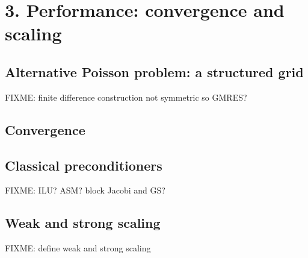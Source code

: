 
\chapter{3. Performance: convergence and scaling}

\section{Alternative Poisson problem: a structured grid}

FIXME: finite difference construction not symmetric so GMRES?


\section{Convergence}

\section{Classical preconditioners}

FIXME:  ILU?  ASM?  block Jacobi and GS?

\section{Weak and strong scaling}

FIXME: define weak and strong scaling

